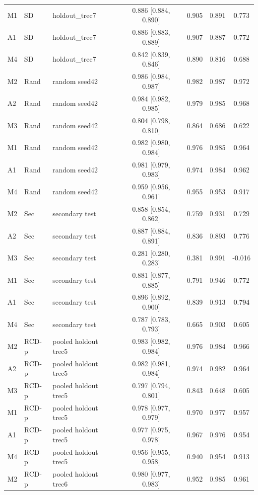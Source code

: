 \begin{table}[!htbp]
\begin{tabular}{lllcccc}
M1 & SD & holdout\_trec7 & 0.886 [0.884, 0.890] & 0.905 & 0.891 & 0.773 \\
A1 & SD & holdout\_trec7 & 0.886 [0.883, 0.889] & 0.907 & 0.887 & 0.772 \\
M4 & SD & holdout\_trec7 & 0.842 [0.839, 0.846] & 0.890 & 0.816 & 0.688 \\
M2 & Rand & random seed42 & 0.986 [0.984, 0.987] & 0.982 & 0.987 & 0.972 \\
A2 & Rand & random seed42 & 0.984 [0.982, 0.985] & 0.979 & 0.985 & 0.968 \\
M3 & Rand & random seed42 & 0.804 [0.798, 0.810] & 0.864 & 0.686 & 0.622 \\
M1 & Rand & random seed42 & 0.982 [0.980, 0.984] & 0.976 & 0.985 & 0.964 \\
A1 & Rand & random seed42 & 0.981 [0.979, 0.983] & 0.974 & 0.984 & 0.962 \\
M4 & Rand & random seed42 & 0.959 [0.956, 0.961] & 0.955 & 0.953 & 0.917 \\
M2 & Sec & secondary test & 0.858 [0.854, 0.862] & 0.759 & 0.931 & 0.729 \\
A2 & Sec & secondary test & 0.887 [0.884, 0.891] & 0.836 & 0.893 & 0.776 \\
M3 & Sec & secondary test & 0.281 [0.280, 0.283] & 0.381 & 0.991 & -0.016 \\
M1 & Sec & secondary test & 0.881 [0.877, 0.885] & 0.791 & 0.946 & 0.772 \\
A1 & Sec & secondary test & 0.896 [0.892, 0.900] & 0.839 & 0.913 & 0.794 \\
M4 & Sec & secondary test & 0.787 [0.783, 0.793] & 0.665 & 0.903 & 0.605 \\
M2 & RCD-p & pooled holdout trec5 & 0.983 [0.982, 0.984] & 0.976 & 0.984 & 0.966 \\
A2 & RCD-p & pooled holdout trec5 & 0.982 [0.981, 0.984] & 0.974 & 0.982 & 0.964 \\
M3 & RCD-p & pooled holdout trec5 & 0.797 [0.794, 0.801] & 0.843 & 0.648 & 0.605 \\
M1 & RCD-p & pooled holdout trec5 & 0.978 [0.977, 0.979] & 0.970 & 0.977 & 0.957 \\
A1 & RCD-p & pooled holdout trec5 & 0.977 [0.975, 0.978] & 0.967 & 0.976 & 0.954 \\
M4 & RCD-p & pooled holdout trec5 & 0.956 [0.955, 0.958] & 0.940 & 0.954 & 0.913 \\
M2 & RCD-p & pooled holdout trec6 & 0.980 [0.977, 0.983] & 0.952 & 0.985 & 0.961 \\

\end{tabular}
\end{table}
